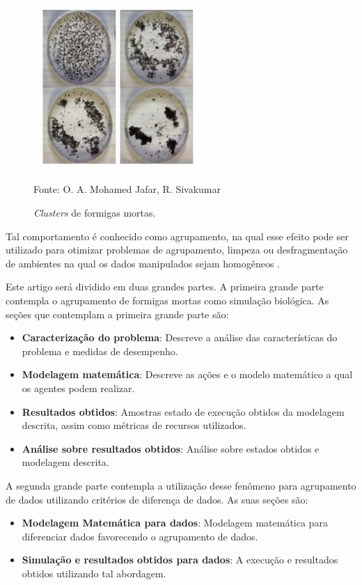 \documentclass[conference]{IEEEtran}
\begin{document}
\begin{figure}[h]
\centering
\includegraphics[width=2.5in]{clusters.png}
\caption{\textit{Clusters} de formigas mortas.}
\label{fig_sim}

Fonte: O. A. Mohamed Jafar, R. Sivakumar \cite{b1}
\end{figure}

Tal comportamento é conhecido como agrupamento, na qual esse efeito pode ser utilizado para otimizar problemas de agrupamento, limpeza ou desfragmentação de ambientes na qual os dados manipulados sejam homogêneos \cite{b1}.

Este artigo será dividido em duas grandes partes. A primeira grande parte contempla o agrupamento de formigas mortas como simulação biológica. As seções que contemplam a primeira grande parte são:

\begin{itemize}
    \item \textbf{Caracterização do problema}: Descreve a análise das características do problema e medidas de desempenho.
    \item \textbf{Modelagem matemática}: Descreve as ações e o modelo matemático a qual os agentes podem realizar.
    \item \textbf{Resultados obtidos}: Amostras estado de execução obtidos da modelagem descrita, assim como métricas de recursos utilizados.
    \item \textbf{Análise sobre resultados obtidos}: Análise sobre estados obtidos e modelagem descrita.
\end{itemize}

A segunda grande parte contempla a utilização desse fenômeno para agrupamento de dados utilizando critérios de diferença de dados. As suas seções são:

\begin{itemize}
    \item \textbf{Modelagem Matemática para dados}: Modelagem matemática para diferenciar dados favorecendo o agrupamento de dados.
    \item \textbf{Simulação e resultados obtidos para dados}: A execução e resultados obtidos utilizando tal abordagem.
\end{itemize}
\end{document}
